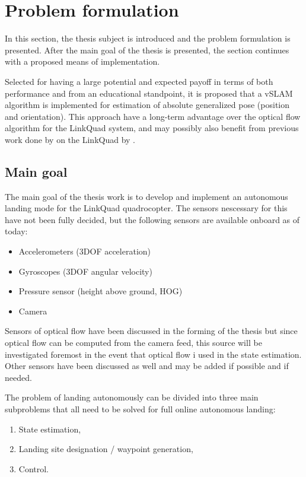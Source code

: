 \section{Problem formulation}
\label{sec:problemformulation}
    In this section, the thesis subject is introduced and the problem
    formulation is presented. After the main goal of the thesis is presented, 
    the section continues with a proposed means of implementation.

    Selected for having a large potential and expected payoff in terms of
    both performance and from an educational standpoint, it is proposed
    that a vSLAM algorithm is implemented for estimation of absolute
    generalized pose (position and orientation).
    This approach have a long-term advantage over the optical flow
    algorithm for the LinkQuad system, and may possibly also benefit from
    previous work done by on the LinkQuad by \cite{Barac11}.
    
    \subsection{Main goal}
        The main goal of the thesis work is to develop and implement
        an autonomous landing mode for the LinkQuad quadrocopter.
        The sensors nescessary for this have not been fully decided,
        but the following sensors are available onboard as of  today:
        \begin{itemize}
            \item Accelerometers (3DOF acceleration)
            \item Gyroscopes (3DOF angular velocity)
            \item Pressure sensor (height above ground, HOG)
            \item Camera
        \end{itemize}

        Sensors of optical flow have been discussed in the forming of the
        thesis but since optical flow can be computed from the camera feed,
        this source will be investigated foremost in the event that optical flow
        i used in the state estimation. Other sensors have been discussed
        as well and may be added if possible and if needed.

        The problem of landing autonomously can be divided into three main
        subproblems that all need to be solved for full online autonomous landing:
        \begin{enumerate}
            \item State estimation,
            \item Landing site designation / waypoint generation,
            \item Control.
        \end{enumerate}


